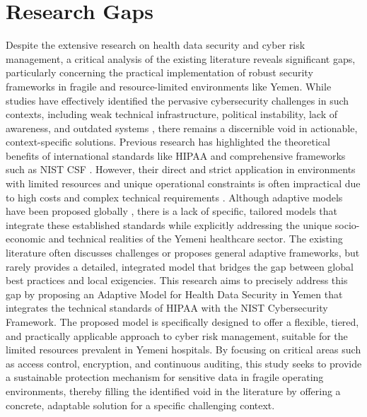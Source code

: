 \documentclass[12pt, a4paper, oneside]{report}
\begin{document}
	\section{Research Gaps}
	Despite the extensive research on health data security and cyber risk management, a critical analysis of the existing literature reveals significant gaps, particularly concerning the practical implementation of robust security frameworks in fragile and resource-limited environments like Yemen. While studies have effectively identified the pervasive cybersecurity challenges in such contexts, including weak technical infrastructure, political instability, lack of awareness, and outdated systems \cite{alhammadi2024advancing} \cite{al2025political} \cite{abdulrab2021assessing} \cite{al2023information}, there remains a discernible void in actionable, context-specific solutions. Previous research has highlighted the theoretical benefits of international standards like HIPAA and comprehensive frameworks such as NIST CSF \cite{hhs2024hipaa} \cite{rahmany2026aida}. However, their direct and strict application in environments with limited resources and unique operational constraints is often impractical due to high costs and complex technical requirements \cite{hhs2024hipaa}.
	Although adaptive models have been proposed globally \cite{melaku2023context} \cite{nist2024sp80066r2} \cite{hasegawa2024cybersecurity} \cite{saad2025fuzzy}, there is a lack of specific, tailored models that integrate these established standards while explicitly addressing the unique socio-economic and technical realities of the Yemeni healthcare sector. The existing literature often discusses challenges or proposes general adaptive frameworks, but rarely provides a detailed, integrated model that bridges the gap between global best practices and local exigencies. This research aims to precisely address this gap by proposing an Adaptive Model for Health Data Security in Yemen that integrates the technical standards of HIPAA with the NIST Cybersecurity Framework. The proposed model is specifically designed to offer a flexible, tiered, and practically applicable approach to cyber risk management, suitable for the limited resources prevalent in Yemeni hospitals. By focusing on critical areas such as access control, encryption, and continuous auditing, this study seeks to provide a sustainable protection mechanism for sensitive data in fragile operating environments, thereby filling the identified void in the literature by offering a concrete, adaptable solution for a specific challenging context.
	
\end{document}
